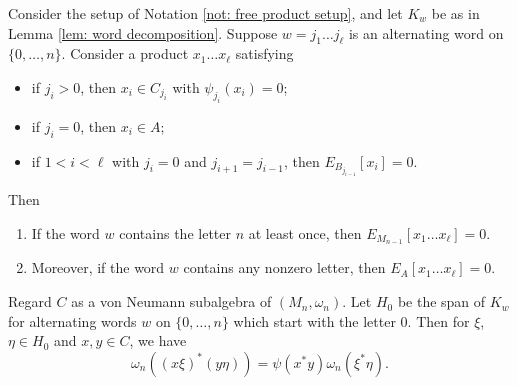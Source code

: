 \documentclass[10pt,a4paper]{amsart}
\begin{document}
\begin{lem} \label{lem: word decomposition 2}
	Consider the setup of Notation \ref{not: free product setup}, and let $K_w$ be as in Lemma \ref{lem: word decomposition}.  Suppose $w = j_1 \dots j_\ell$ is an alternating word on $\{0,\dots,n\}$.  Consider a product $x_1 \dots x_\ell$ satisfying
	\begin{itemize}
		\item[\emph{(a)}] if $j_i > 0$, then $x_i \in C_{j_i}$ with $\psi_{j_i}(x_i) = 0$;
		\item[\emph{(b)}] if $j_i = 0$, then $x_i \in A$;
		\item[\emph{(c')}] if $1 < i < \ell$ with $j_i = 0$ and $j_{i+1} = j_{i-1}$, then $E_{B_{j_{i-1}}}[x_i] = 0$.
	\end{itemize}
	Then
	\begin{enumerate}[(1)]
		\item If the word $w$ contains the letter $n$ at least once, then $E_{M_{n-1}}[x_1 \dots x_\ell] = 0$.
		\item Moreover, if the word $w$ contains any nonzero letter, then $E_A[x_1 \dots x_\ell] = 0$.
	\end{enumerate}
\end{lem}

\begin{lem} \label{lem: word decomposition 3}
Regard $C$ as a von Neumann subalgebra of $(M_n,\omega_n)$.  Let $H_0$ be the span of $K_w$ for alternating words $w$ on $\{0,\dots,n\}$ which start with the letter $0$.  Then for $\xi$, $\eta \in H_0$ and $x, y \in C$, we have
\begin{equation} \label{eq: inner product equality}
\omega_n((x\xi)^*(y\eta)) = \psi(x^*y) \omega_n(\xi^* \eta).
\end{equation}
\end{lem}
\end{document}
